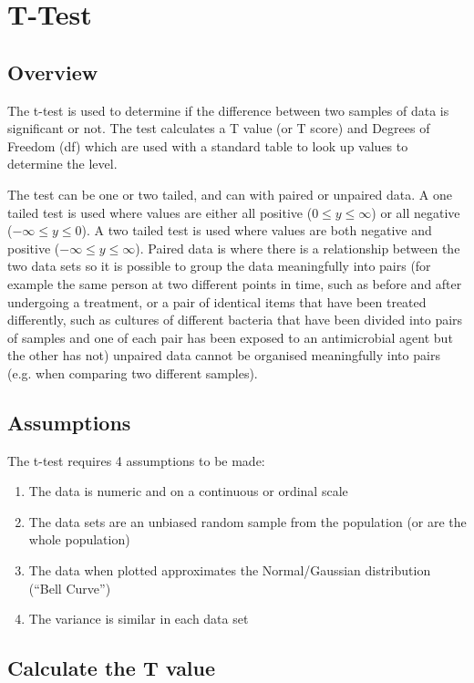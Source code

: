 \chapter{T-Test} \label{t-test}

\section{Overview}
The t-test is used to determine if the difference between two samples of data is significant or not.  The test calculates a T value (or T score) and Degrees of Freedom (df) which are used with a standard table to look up values to determine the   level.

The test can be one or two tailed, and can with paired or unpaired data.  A one tailed test is used where values are either all positive ($0 \leq y \leq \infty$) or all negative ($- \infty \leq y \leq 0$).  A two tailed test is used where values are both negative and positive ($- \infty \leq y \leq \infty$).  Paired data is where there is a relationship between the two data sets so it is possible to group the data meaningfully into pairs (for example the same person at two different points in time, such as before and after undergoing a treatment, or a pair of identical items that have been treated differently, such as cultures of different bacteria that have been divided into pairs of samples and one of each pair has been exposed to an antimicrobial agent but the other has not) unpaired data cannot be organised meaningfully into pairs (e.g. when comparing two different samples).

\section{Assumptions}
The t-test requires 4 assumptions to be made:
\begin{enumerate}
\item The data is numeric and on a continuous or ordinal scale
\item The data sets are an unbiased random sample from the population (or are the whole population)
\item The data when plotted approximates the Normal/Gaussian distribution (``Bell Curve'')
\item The variance is similar in each data set
\end{enumerate}

\section{Calculate the T value}

